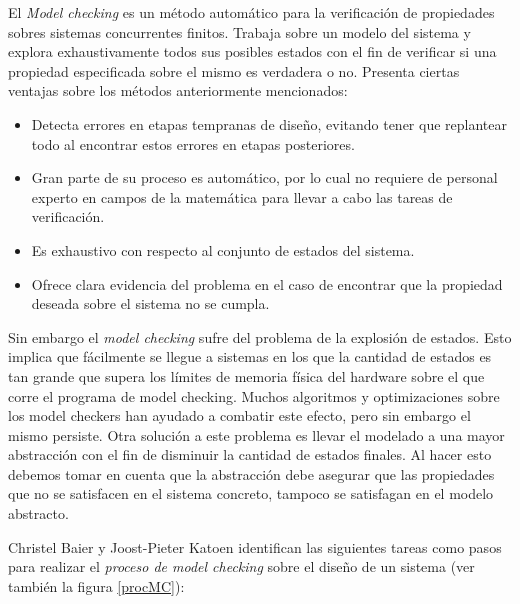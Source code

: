 \documentclass[pdftex,a4paper,12pt]{book}
\begin{document}
El \textit{Model checking} es un m\'etodo autom\'atico para la verificaci\'on de propiedades sobres sistemas concurrentes finitos. Trabaja sobre un modelo del sistema y explora exhaustivamente todos sus posibles estados con el fin de verificar si una propiedad especificada sobre el mismo es verdadera o no. Presenta ciertas ventajas sobre los m\'etodos anteriormente mencionados:

\begin{itemize}
\item Detecta errores en etapas tempranas de dise\~no, evitando tener que replantear todo al encontrar estos errores en etapas posteriores.

\item Gran parte de su proceso es autom\'atico, por lo cual no requiere de personal experto en campos de la matem\'atica para llevar a cabo las tareas de verificaci\'on.

\item Es exhaustivo con respecto al conjunto de estados del sistema.

\item Ofrece clara evidencia del problema en el caso de encontrar que la propiedad deseada sobre el sistema no se cumpla.
\end{itemize}

Sin embargo el \textit{model checking} sufre del problema de la explosi\'on de estados. Esto implica que f\'acilmente se llegue a sistemas en los que la cantidad de estados es tan grande que supera los l\'imites de memoria f\'isica del hardware sobre el que corre el programa de model checking. Muchos algoritmos y optimizaciones sobre los model checkers han ayudado a combatir este efecto, pero sin embargo el mismo persiste. Otra soluci\'on a este problema es llevar el modelado a una mayor abstracci\'on con el fin de disminuir la cantidad de estados finales. Al hacer esto debemos tomar en cuenta que la abstracci\'on debe asegurar que las propiedades que no se satisfacen en el sistema concreto, tampoco se satisfagan en el modelo abstracto.

Christel Baier y Joost-Pieter Katoen \cite{Baier} identifican las siguientes tareas como pasos para realizar el \textit{proceso de model checking} sobre el dise\~no de un sistema (ver tambi\'en la figura \ref{procMC}):
\end{document}
